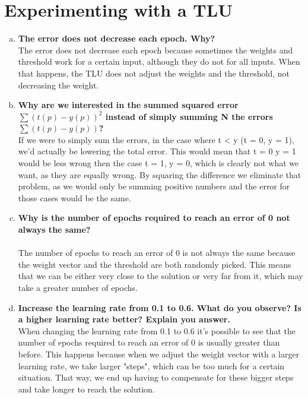 \documentclass{article}
\begin{document}
\pagebreak

\section{Experimenting with a TLU}

\begin{enumerate}[a)]
\item \textbf{The error does not decrease each epoch. Why?} \\ 
The error does not decrease each epoch because sometimes the weights and threshold work for a certain input, although they do not for all inputs. When that happens, the TLU does not adjust the weights and the threshold, not decreasing the weight. \\

\item \textbf{Why are we interested in the summed squared error  $\sum(t(p) - y(p))^2$ instead of simply summing
N
the errors  $\sum(t(p) - y(p))$?}\\
If we were to simply sum the errors, in the case where t < y (t = 0, y = 1), we'd actually be lowering the total error. This would mean that t = 0 y = 1 would be less wrong then the case t = 1, y = 0, which is clearly not what we want, as they are equally wrong. By squaring the difference we eliminate that problem, as we would only be summing positive numbers and the error for those cases would be the same. \\

\item \textbf{Why is the number of epochs required to reach an error of 0 not always the same?}\\ \\
The number of epochs to reach an error of 0 is not always the same because the weight vector and the threshold are both randomly picked. This means that we can be either very close to the solution or very far from it, which may take a greater number of epochs. \\

\item \textbf{Increase the learning rate from 0.1 to 0.6. What do you observe? Is a higher learning rate better? Explain you answer.}\\ 
When changing the learning rate from 0.1 to 0.6 it's possible to see that the number of epochs required to reach an error of 0 is usually greater than before. This happens because when we adjust the weight vector with a larger learning rate, we take larger "steps", which can be too much for a certain situation. That way, we end up having to compensate for these bigger steps and take longer to reach the solution. \\


\end{enumerate}
\end{document}
